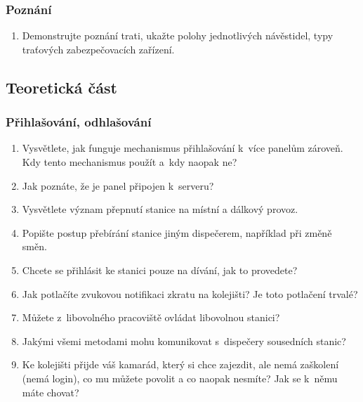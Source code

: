 \documentclass[12pt,a4paper]{article}
\begin{document}
\subsubsection*{Poznání}
\begin{enumerate}[leftmargin=*]
\item Demonstrujte poznání trati, ukažte polohy jednotlivých návěstidel, typy
traťových zabezpečovacích zařízení.
\end{enumerate}


\subsection{Teoretická část}

\subsubsection*{Přihlašování, odhlašování}
\begin{enumerate}[leftmargin=*]

\item Vysvětlete, jak funguje mechanismus přihlašování k~více panelům zároveň.
Kdy tento mechanismus použít a~kdy naopak ne?

\item Jak poznáte, že je panel připojen k~serveru?

\item Vysvětlete význam přepnutí stanice na místní a dálkový provoz.

\item Popište postup přebírání stanice jiným dispečerem, například při změně
směn.

\item Chcete se přihlásit ke stanici pouze na dívání, jak to provedete?

\item Jak potlačíte zvukovou notifikaci zkratu na kolejišti? Je toto
potlačení trvalé?

\item Můžete z~libovolného pracoviště ovládat libovolnou stanici?

\item Jakými všemi metodami mohu komunikovat s~dispečery sousedních stanic?

\item Ke kolejišti přijde váš kamarád, který si chce zajezdit, ale nemá
zaškolení (nemá login), co mu můžete povolit a co naopak nesmíte? Jak se k~němu
máte chovat?

\end{enumerate}
\end{document}
